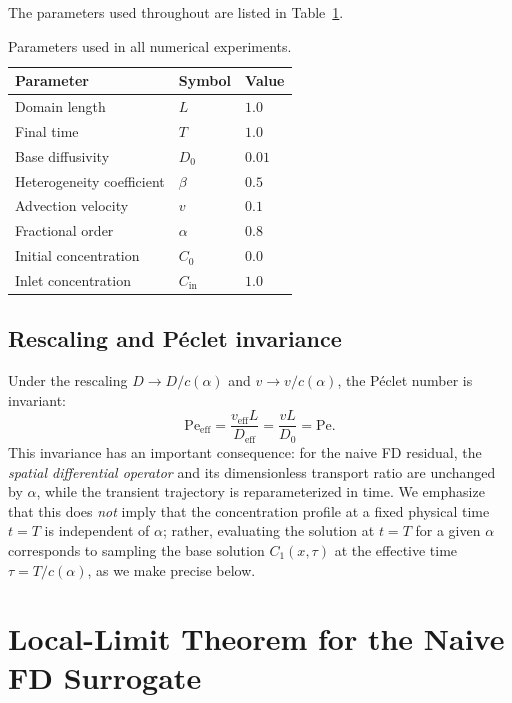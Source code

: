\documentclass[11pt]{article}
\begin{document}
The parameters used throughout are listed in Table~\ref{tab:params}.

\begin{table}[h]
\centering
\caption{Parameters used in all numerical experiments.}
\label{tab:params}
\begin{tabular}{lll}
\toprule
Parameter & Symbol & Value \\
\midrule
Domain length & \(L\) & \(1.0\) \\
Final time & \(T\) & \(1.0\) \\
Base diffusivity & \(D_0\) & \(0.01\) \\
Heterogeneity coefficient & \(\beta\) & \(0.5\) \\
Advection velocity & \(v\) & \(0.1\) \\
Fractional order & \(\alpha\) & \(0.8\) \\
Initial concentration & \(C_0\) & \(0.0\) \\
Inlet concentration & \(C_{\mathrm{in}}\) & \(1.0\) \\
\bottomrule
\end{tabular}
\end{table}

\subsection{Rescaling and P\'eclet invariance}
\label{sec:peclet}

Under the rescaling \(D \to D/c(\alpha)\) and \(v \to v/c(\alpha)\), the P\'eclet number is invariant:
\begin{equation}
\mathrm{Pe}_{\mathrm{eff}} = \frac{v_{\mathrm{eff}} L}{D_{\mathrm{eff}}} = \frac{vL}{D_0} = \mathrm{Pe}.
\end{equation}
This invariance has an important consequence: for the naive FD residual, the \emph{spatial differential operator} and its dimensionless transport ratio are unchanged by \(\alpha\), while the transient trajectory is reparameterized in time. We emphasize that this does \emph{not} imply that the concentration profile at a fixed physical time \(t=T\) is independent of \(\alpha\); rather, evaluating the solution at \(t=T\) for a given \(\alpha\) corresponds to sampling the base solution \(C_1(x,\tau)\) at the effective time \(\tau = T/c(\alpha)\), as we make precise below.

\section{Local-Limit Theorem for the Naive FD Surrogate}
\label{sec:local_limit}
\end{document}
